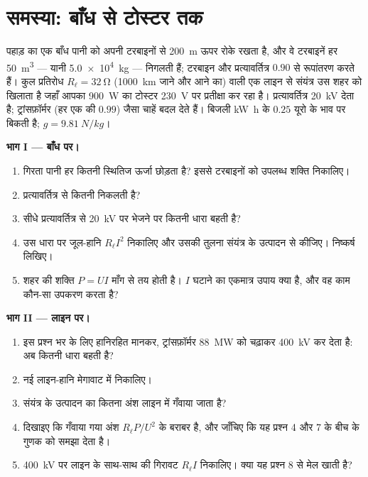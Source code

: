 \section{समस्या: बाँध से टोस्टर तक}

\begin{problem}[{सप्ताहांत समस्या --- एक किलोवाट-घंटे की हज़ार किलोमीटर
लंबी यात्रा, गिरते पानी से लेकर सिंकती रोटी तक, और सफ़र का पूरा
हिसाब}]
\label{pb:g11:circuits-and-power:1}
पहाड़ का एक बाँध पानी को अपनी टरबाइनों से \qty{200}{m} ऊपर रोके रखता है, और वे
टरबाइनें हर  \qty{50}{m^3} --- यानी \qty{5.0e4}{kg} --- निगलती हैं; टरबाइन और
प्रत्यावर्तित्र  $0.90$ से रूपांतरण करते हैं। कुल
प्रतिरोध $R_\ell = \qty{32}{\ohm}$ (\qty{1000}{km} जाने और आने का) वाली एक लाइन से संयंत्र
उस शहर को खिलाता है जहाँ आपका \qty{900}{W} का टोस्टर \qty{230}{V} पर प्रतीक्षा कर रहा
है। प्रत्यावर्तित्र \qty{20}{kV} देता है; ट्रांसफ़ॉर्मर (हर एक की 
$0.99$)  जैसा चाहें बदल देते हैं। बिजली \unit{kW.h} के
$0.25$ यूरो के भाव पर बिकती है; $g = \qty{9.81}{N/kg}$।

\medskip
\noindent\textbf{भाग I --- बाँध पर।}
\begin{enumerate}
  \item गिरता पानी हर  कितनी स्थितिज ऊर्जा छोड़ता है? इससे
        टरबाइनों को उपलब्ध शक्ति निकालिए।
  \item प्रत्यावर्तित्र से कितनी  निकलती है?
  \item सीधे प्रत्यावर्तित्र से \qty{20}{kV} पर भेजने पर कितनी धारा बहती है?
  \item उस धारा पर जूल-हानि $R_\ell I^2$ निकालिए और उसकी तुलना संयंत्र के उत्पादन
        से कीजिए। निष्कर्ष लिखिए।
  \item शहर की शक्ति $P = UI$ माँग से तय होती है। $I$ घटाने का
        एकमात्र उपाय क्या है, और वह काम कौन-सा उपकरण करता है?
\end{enumerate}

\medskip
\noindent\textbf{भाग II --- लाइन पर।}
\begin{enumerate}[resume]
  \item इस प्रश्न भर के लिए हानिरहित मानकर, ट्रांसफ़ॉर्मर \qty{88}{MW} को चढ़ाकर
        \qty{400}{kV} कर देता है: अब कितनी धारा बहती है?
  \item नई लाइन-हानि मेगावाट में निकालिए।
  \item संयंत्र के उत्पादन का कितना अंश लाइन में गँवाया जाता है?
  \item दिखाइए कि गँवाया गया अंश $R_\ell P/U^2$ के बराबर है, और जाँचिए कि यह
        प्रश्न 4 और 7 के बीच के गुणक को समझा देता है।
  \item \qty{400}{kV} पर लाइन के साथ-साथ  की गिरावट $R_\ell I$
        निकालिए। क्या यह प्रश्न 8 से मेल खाती है?
\end{enumerate}


\end{problem}
